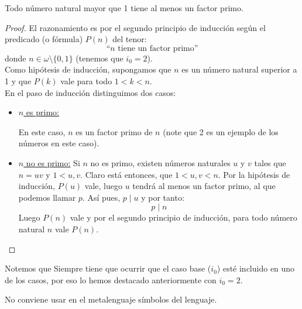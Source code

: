 \begin{ejemplo}
    Todo número natural mayor que 1 tiene al menos un factor primo.
\begin{proof}
    El razonamiento es por el segundo principio de inducción según el predicado (o fórmula) $P(n)$ del tenor:
    $$\text{``}n \text{ tiene un factor primo}\text{''}$$
    donde $n \in \omega \setminus \{ 0, 1\}$ (tenemos que $i_0 = 2$).\\

    \noindent
    Como hipótesis de inducción, supongamos que $n$ es un número natural superior a 1 y que $P(k)$ vale para todo $1<k < n$.\\

    \noindent
    En el paso de inducción distinguimos dos casos:
    
    \begin{itemize}
        \item \ul{$n$ es primo:} 

            En este caso, $n$ es un factor primo de $n$ (note que 2 es un ejemplo de los números en este caso).
        \item \ul{$n$ no es primo:}
            Si $n$ no es primo, existen números naturales $u$ y $v$ tales que $n = uv$ y $1<u,v$. Claro está entonces, que $1<u,v<n$.\newline
            Por la hipótesis de inducción, $P(u)$ vale, luego $u$ tendrá al menos un factor primo, al que podemos llamar $p$. Así pues, $p \mid u$ y por tanto:
            $$p \mid n$$
            Luego $P(n)$ vale y por el segundo principio de inducción, para todo número natural $n$ vale $P(n)$.
    \end{itemize}
\end{proof}

Notemos que Siempre tiene que ocurrir que el caso base ($i_0$) esté incluido en uno de los casos, por eso lo hemos destacado anteriormente con $i_0 = 2$.
\end{ejemplo}

\begin{observacion}
    No conviene usar en el metalenguaje símbolos del lenguaje.
\end{observacion}

